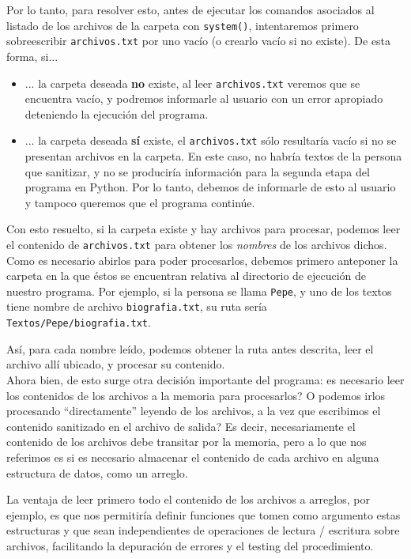 \documentclass[a4paper]{article}
\begin{document}
Por lo tanto, para resolver esto, antes de ejecutar los comandos asociados al listado de los archivos de la carpeta con \texttt{system()}, intentaremos primero sobreescribir \texttt{archivos.txt} por uno vacío (o crearlo vacío si no existe). De esta forma, si...

\begin{itemize}
    \item ... la carpeta deseada \textbf{no} existe, al leer \texttt{archivos.txt} veremos que se encuentra vacío, y podremos informarle al usuario con un error apropiado deteniendo la ejecución del programa.
    \item ... la carpeta deseada \textbf{sí} existe, el \texttt{archivos.txt} sólo resultaría vacío si no se presentan archivos en la carpeta. En este caso, no habría textos de la persona que sanitizar, y no se produciría información para la segunda etapa del programa en Python. Por lo tanto, debemos de informarle de esto al usuario y tampoco queremos que el programa continúe.
\end{itemize}

Con esto resuelto, si la carpeta existe y hay archivos para procesar, podemos leer el contenido de \texttt{archivos.txt} para obtener los \textit{nombres} de los archivos dichos. Como es necesario abirlos para poder procesarlos, debemos primero anteponer la carpeta en la que éstos se encuentran relativa al directorio de ejecución de nuestro programa. Por ejemplo, si la persona se llama \texttt{Pepe}, y uno de los textos tiene nombre de archivo \texttt{biografia.txt}, su ruta sería \texttt{Textos/Pepe/biografia.txt}.

Así, para cada nombre leído, podemos obtener la ruta antes descrita, leer el archivo allí ubicado, y procesar su contenido. \\

Ahora bien, de esto surge otra decisión importante del programa: es necesario leer los contenidos de los archivos a la memoria para procesarlos? O podemos irlos procesando ``directamente'' leyendo de los archivos, a la vez que escribimos el contenido sanitizado en el archivo de salida?
Es decir, necesariamente el contenido de los archivos debe transitar por la memoria, pero a lo que nos referimos es si es necesario almacenar el contenido de cada archivo en alguna estructura de datos, como un arreglo.

La ventaja de leer primero todo el contenido de los archivos a arreglos, por ejemplo, es que nos permitiría definir funciones que tomen como argumento estas estructuras y que sean independientes de operaciones de lectura / escritura sobre archivos, facilitando la depuración de errores y el testing del procedimiento.
\end{document}
